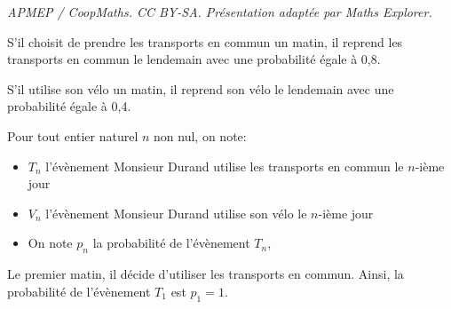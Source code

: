 \documentclass[10pt]{article}
\begin{document}
\noindent\textit{APMEP / CoopMaths. CC BY-SA. Présentation adaptée par Maths Explorer.}\par\medskip
\medskip




S'il choisit de prendre les transports en commun un matin, il reprend les transports en
commun le lendemain avec une probabilité égale à 0,8.

S'il utilise son vélo un matin, il reprend son vélo le lendemain avec une probabilité égale
à 0,4.

\medskip

Pour tout entier naturel $n$ non nul, on note:
\begin{itemize}
\item  $T_n$ l'évènement \og Monsieur Durand utilise les transports en commun le $n$-ième jour\fg
\item  $V_n$ l'évènement \og  Monsieur Durand utilise son vélo le $n$-ième jour\fg
\item On note $p_n$ la probabilité de l'évènement $T_n$,
\end{itemize}

Le premier matin, il décide d'utiliser les transports en commun. Ainsi, la probabilité de
l'évènement $T_1$ est $p_1 = 1$.
\end{document}
